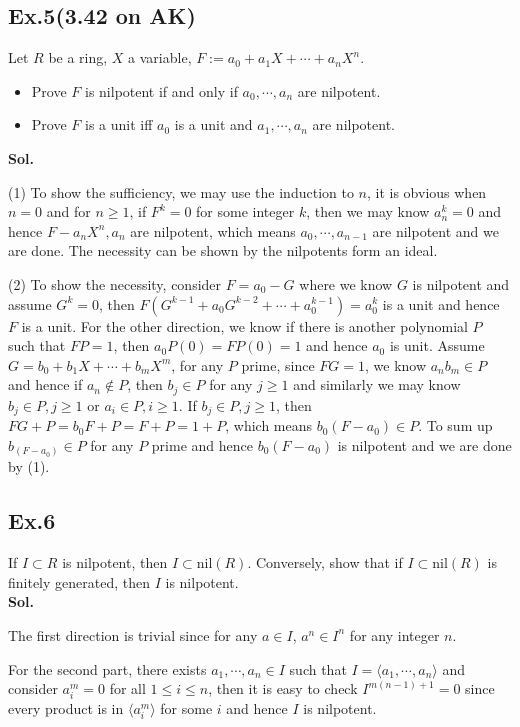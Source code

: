 \documentclass[lang=en,11pt,a4paper,citestyle =authoryear]{elegantpaper}
\begin{document}
\subsection*{Ex.5(3.42 on AK)} 
Let $R$ be a ring, $X$ a variable, $F:=a_0+a_1X+\cdots+a_nX^n$.
\begin{itemize}
    \item Prove $F$ is nilpotent if and only if $a_0,\cdots,a_n$ are nilpotent.
    \item Prove $F$ is a unit iff $a_0$ is a unit and $a_1,\cdots,a_n$ are nilpotent.
\end{itemize}
\vspace{0.5em}
\textbf{Sol.} \par
(1) To show the sufficiency, we may use the induction to $n$, it is obvious when $n=0$ and for $n\geq 1$, if $F^k = 0$ for some integer $k$, then we may know $a_n^k = 0$ and hence $F-a_nX^n, a_n$ are nilpotent, which means $a_0,\cdots,a_{n-1}$ are nilpotent and we are done. The necessity can be shown by the nilpotents form an ideal.\par
(2) To show the necessity, consider $F = a_0 - G$ where we know $G$ is nilpotent and assume $G^k = 0$, then $F(G^{k-1}+a_0G^{k-2}+\cdots + a_0^{k-1}) = a_0^{k}$ is a unit and hence $F$ is a unit. For the other direction, we know if there is another polynomial $P$ such that $FP = 1$, then $a_0P(0) = FP(0) = 1$ and hence $a_0$ is unit. Assume $G = b_0+b_1X+\cdots+b_mX^m$, for any $P$ prime, since $FG = 1$, we know $a_nb_m \in P$ and hence if $a_n\notin P$, then $b_j \in P$ for any $j\geq 1$ and similarly we may know $b_j \in P, j\geq 1$ or $a_i \in P, i\geq 1$. If $b_j \in P, j\geq 1$, then $FG + P = b_0F + P = F+P = 1+P$, which means $b_0(F-a_0) \in P$. To sum up $b_(F-a_0) \in P$ for any $P$ prime and hence $b_0(F-a_0)$ is nilpotent and we are done by (1).
\par 
\vspace{0.5em}

\subsection*{Ex.6} 
    If $I\subset R$ is nilpotent, then $I\subset \text{nil}(R)$. Conversely, show that if $I\subset \text{nil}(R)$ is finitely generated, then $I$ is nilpotent.  
\vspace{0.5em}\\
\textbf{Sol.} \par
    The first direction is trivial since for any $a\in I$, $a^n \in I^n$ for any integer $n$.\par
    For the second part, there exists $a_1,\cdots,a_n\in I$ such that $I = \langle a_1,\cdots,a_n\rangle$ and consider $a_i^m = 0$ for all $1\leq i \leq n$, then it is easy to check $I^{m(n-1)+1} = 0$ since every product is in $\langle a_i^m\rangle$ for some $i$ and hence $I$ is nilpotent. 
\vspace{0.5em}
\end{document}
